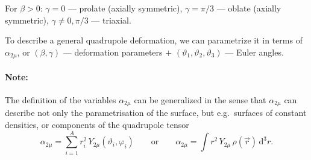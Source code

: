 \documentclass[11pt,a4paper]{article}
\newcommand{\ud}{\mathrm{d}}
\begin{document}
For $\beta>0$: $\gamma=0$ --- prolate (axially symmetric), $\gamma=\pi/3$ --- oblate (axially symmetric), $\gamma\neq0,\pi/3$ --- triaxial.
\begin{center}
\end{center}
To describe a general quadrupole deformation, we can parametrize it in terms of $\alpha_{2\mu}$, or $(\beta,\gamma)$ --- deformation parameters $+$ $(\vartheta_1,\vartheta_2,\vartheta_3)$ --- Euler angles.

\paragraph{Note:} The definition of the variables $\alpha_{2\mu}$ can be generalized in the sense that $\alpha_{2\mu}$ can describe not only the parametrisation of the surface, but e.g.\ surfaces of constant densities, or components of the quadrupole tensor
\[
\alpha_{2\mu}=\sum_{i=1}^Ar_i^2\,Y_{2\mu}(\vartheta_i,\varphi_i)\qquad\text{or}\qquad
\alpha_{2\mu}=\int r^2\,Y_{2\mu}\,\rho(\vec r)\,\ud^3r .
\]

\end{document}
